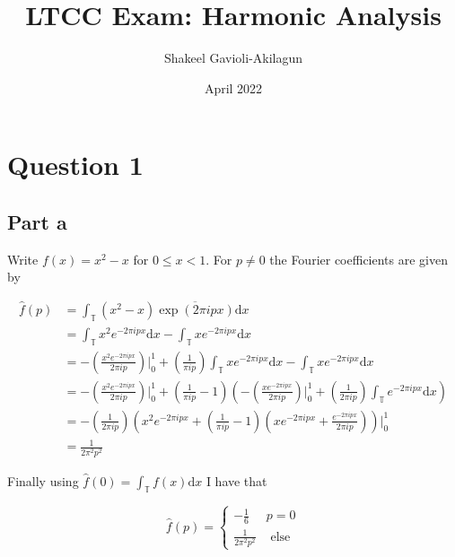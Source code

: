 \documentclass{article}
\title{LTCC Exam: Harmonic Analysis}
\author{Shakeel Gavioli-Akilagun}
\date{April 2022}
\begin{document}
\maketitle

\section*{Question 1}

\subsection*{Part a}

Write $f \left ( x \right ) = x^2 - x$ for $0 \leq x < 1$. For $p \neq 0$ the Fourier coefficients are given by

\begin{align}
	\hat{f} \left ( p \right ) & = \int_{\mathbb{T}} \left ( x^2 - x \right ) \overline{ \exp \left ( 2 \pi i p x \right ) } \mathrm{d}x \\ 
	& =  \int_{\mathbb{T}} x^2 e^{-2 \pi i p x} \mathrm{d}x - \int_{\mathbb{T}} x e^{-2 \pi i p x} \mathrm{d}x \\ 
	& = - \left ( \frac{x^2 e^{-2 \pi i p x}}{2 \pi i p} \right )\Biggr|_{0}^{1} + \left ( \frac{1}{\pi i p} \right ) \int_{\mathbb{T}} x e^{-2 \pi i p x} \mathrm{d}x - \int_{\mathbb{T}} x e^{-2 \pi i p x} \mathrm{d}x \\ 
	& = - \left ( \frac{x^2 e^{-2 \pi i p x}}{2 \pi i p} \right )\Biggr|_{0}^{1} + \left ( \frac{1}{\pi i p} - 1 \right ) \left ( - \left ( \frac{x e^{-2 \pi i p x}}{2 \pi i p} \right )\Biggr|_{0}^{1} + \left ( \frac{1}{2 \pi i p} \right ) \int_{\mathbb{T}} e^{-2 \pi i p x} \mathrm{d}x \right ) \\ 
	& = - \left ( \frac{1}{2 \pi i p} \right ) \left ( x^2 e^{-2 \pi i p x} + \left ( \frac{1}{\pi i p} - 1 \right ) \left ( x e^{-2 \pi i p x} + \frac{e^{-2 \pi i p x}}{2 \pi i p} \right ) \right )\Biggr|_0^1 \\
	& = \frac{1}{2 \pi^2 p^2}
\end{align}

Finally using $\hat{f} \left ( 0 \right ) = \int_{\mathbb{T}} f(x) \mathrm{d}x$ I have that

\begin{equation}
	\hat{f} \left ( p \right ) =
	\begin{cases}
-\frac{1}{6} & p = 0 \\
\frac{1}{2 \pi^2 p^2} & \text{ else}
\end{cases}
\end{equation}
\end{document}
